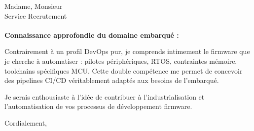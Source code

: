 \documentclass[11pt,a4paper]{letter}
\begin{document}
\begin{letter}{Madame, Monsieur \\ Service Recrutement \\ [Nom de l'entreprise] \\ [Adresse]}
\textbf{Connaissance approfondie du domaine embarqu\'e :}

Contrairement \`a un profil DevOps pur, je comprends intimement le firmware que je cherche \`a automatiser : pilotes p\'eriph\'eriques, RTOS, contraintes m\'emoire, toolchains sp\'ecifiques MCU. Cette double comp\'etence me permet de concevoir des pipelines CI/CD v\'eritablement adapt\'es aux besoins de l'embarqu\'e.

Je serais enthousiaste \`a l'id\'ee de contribuer \`a l'industrialisation et l'automatisation de vos processus de d\'eveloppement firmware.

\closing{Cordialement,}

\end{letter}
\end{document}
